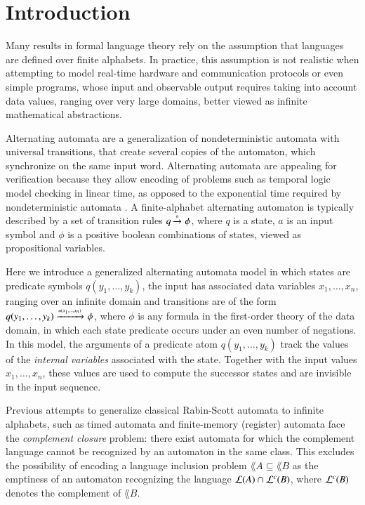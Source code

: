 \section{Introduction}

Many results in formal language theory rely on the assumption that
languages are defined over finite alphabets. In practice, this
assumption is not realistic when attempting to model real-time
hardware and communication protocols or even simple programs, whose
input and observable output requires taking into account data values,
ranging over very large domains, better viewed as infinite
mathematical abstractions.

Alternating automata are a generalization of nondeterministic automata
with universal transitions, that create several copies of the
automaton, which synchronize on the same input word. Alternating
automata are appealing for verification because they allow encoding of
problems such as temporal logic model checking in linear time, as
opposed to the exponential time required by nondeterministic automata
\cite{Vardi95}. A finite-alphabet alternating automaton is typically
described by a set of transition rules $q \xrightarrow{{\scriptscriptstyle a}}_{{\scriptstyle }} \phi$, where $q$
is a state, $a$ is an input symbol and $\phi$ is a positive boolean
combinations of states, viewed as propositional variables.

Here we introduce a generalized alternating automata model in which
states are predicate symbols $q(y_1,\ldots,y_k)$, the input has
associated data variables $x_1,\ldots,x_n$, ranging over an infinite
domain and transitions are of the form $q(y_1,\ldots,y_k)
\xrightarrow{{\scriptscriptstyle a(x_1,\ldots,x_n)}}_{{\scriptstyle }} \phi$, where $\phi$ is any formula in the
first-order theory of the data domain, in which each state predicate
occurs under an even number of negations. In this model, the arguments
of a predicate atom $q(y_1,\ldots,y_k)$ track the values of the
\emph{internal variables} associated with the state. Together with the
input values $x_1,\ldots,x_n$, these values are used to compute the
successor states and are invisible in the input sequence.

Previous attempts to generalize classical Rabin-Scott automata to
infinite alphabets, such as timed automata \cite{AlurDill94} and
finite-memory (register) automata \cite{KaminskiFrancez94} face the
\emph{complement closure} problem: there exist automata for which the
complement language cannot be recognized by an automaton in the same
class. This excludes the possibility of encoding a language inclusion
problem $\lang{A} \subseteq \lang{B}$ as the emptiness of an automaton
recognizing the language ${\mathcal L}({A}) \cap {\mathcal L}^c({B})$, where ${\mathcal L}^c({B})$
denotes the complement of $\lang{B}$. 

